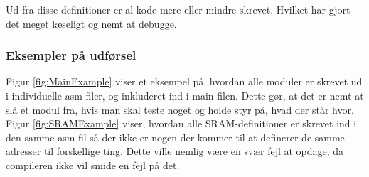 Ud fra disse definitioner er al kode mere eller mindre skrevet. Hvilket har gjort det meget læseligt og nemt at debugge.

\subsubsection{Eksempler på udførsel}
Figur \ref{fig:MainExample} viser et eksempel på, hvordan alle moduler er skrevet ud i individuelle asm-filer, og inkluderet ind i main filen. Dette gør, at det er nemt at slå et modul fra, hvis man skal teste noget og holde styr på, hvad der står hvor. Figur \ref{fig:SRAMExample} viser, hvordan alle SRAM-definitioner er skrevet ind i den samme asm-fil så der ikke er nogen der kommer til at definerer de samme adresser til forskellige ting. Dette ville nemlig være en svær fejl at opdage, da compileren ikke vil smide en fejl på det. 


